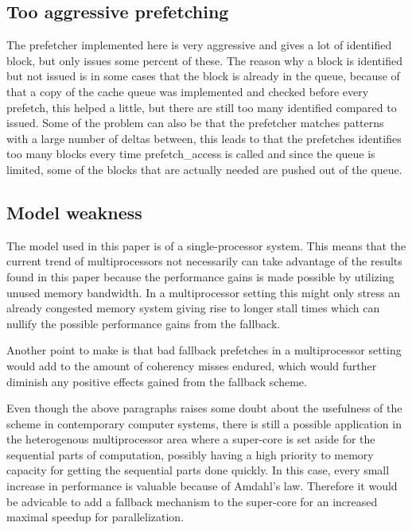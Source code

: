 \documentclass[12pt,journal,compsoc]{IEEEtran}
\begin{document}
\subsection{Too aggressive prefetching}
The prefetcher implemented here is very aggressive and gives a lot of identified block, but only issues some percent of these. The reason why a block is identified but not issued is in some cases that the block is already in the queue, because of that a copy of the cache queue was implemented and checked before every prefetch, this helped a little, but there are still too many identified compared to issued. Some of the problem can also be that the prefetcher matches patterns with a large number of deltas between, this leads to that the prefetches identifies too many blocks every time prefetch\_access is called and since the queue is limited, some of the blocks that are actually needed are pushed out of the queue. %

\subsection{Model weakness}
The model used in this paper is of a single-processor system.
This means that the current trend of multiprocessors not
necessarily can take advantage of the results found in
this paper because the performance gains is made possible
by utilizing unused memory bandwidth. In a multiprocessor
setting this might only stress an already congested memory
system giving rise to longer stall times which can nullify
the possible performance gains from the fallback.

Another point to make is that bad fallback prefetches in a
multiprocessor setting would add to the amount of coherency
misses endured, which would further diminish any positive
effects gained from the fallback scheme.

Even though the above paragraphs raises some doubt about
the usefulness of the scheme in contemporary computer systems,
there is still a possible application in the heterogenous
multiprocessor area where a super-core is set aside for the
sequential parts of computation, possibly having a high priority
to memory capacity for getting the sequential parts done quickly.
In this case, every small increase in performance is valuable
because of Amdahl's law. Therefore it would be advicable to add
a fallback mechanism to the super-core for an increased maximal
speedup for parallelization.
\end{document}
